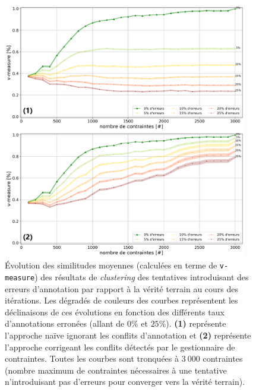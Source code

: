 			\begin{figure}[!htb]
				\centering
				\includegraphics[width=0.95\textwidth]{figures/etude-robustesse-erreurs-et-corrections-closest}
				\caption{
					Évolution des similitudes moyennes (calculées en terme de \texttt{v-measure}) des résultats de \textit{clustering} des tentatives introduisant des erreurs d'annotation par rapport à la vérité terrain au cours des itérations.
					Les dégradés de couleurs des courbes représentent les déclinaisons de ces évolutions en fonction des différents taux d'annotations erronées (allant de $0$\% et $25$\%).
					\textbf{(1)} représente l'approche naïve ignorant les conflits d'annotation
					et \textbf{(2)} représente l'approche corrigeant les conflits détectés par le gestionnaire de contraintes.
					Toutes les courbes sont tronquées à $3~000$ contraintes (nombre maximum de contraintes nécessaires à une tentative n'introduisant pas d'erreurs pour converger vers la vérité terrain).
				}
				\label{figure:4.6.2-ETUDE-ROBUSTESSE-ERREURS-ANNOTATION-ET-CORRECTION}
			\end{figure}
			
